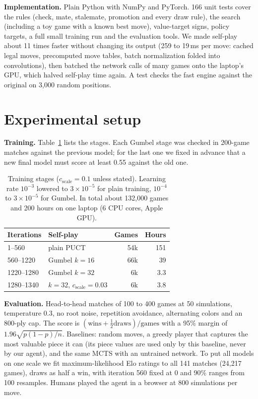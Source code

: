 \documentclass[11pt,a4paper,twocolumn]{article}
\begin{document}
\textbf{Implementation.} Plain Python with NumPy and PyTorch. 166 unit tests cover the rules
(check, mate, stalemate, promotion and every draw rule), the search (including a toy game
with a known best move), value-target signs, policy targets, a full small training run and
the evaluation tools. We made self-play about 11 times faster without changing its output
(259 to 19\,ms per move: cached legal moves, precomputed move tables, batch normalization
folded into convolutions), then batched the network calls of many games onto the laptop's
GPU, which halved self-play time again. A test checks the fast engine against the original
on 3,000 random positions.

\section{Experimental setup}
\textbf{Training.} Table~\ref{tab:stages} lists the stages. Each Gumbel stage was checked
in 200-game matches against the previous model; for the last one we fixed in advance
that a new final model must score at least 0.55 against the old one.

\begin{table}[h]
\centering
\small
\begin{tabular}{@{}llrr@{}}
\toprule
Iterations & Self-play & Games & Hours \\
\midrule
1--560 & plain PUCT & 54k & 151 \\
560--1220 & Gumbel $k{=}16$ & 66k & 39 \\
1220--1280 & Gumbel $k{=}32$ & 6k & 3.3 \\
1280--1340 & $k{=}32$, $c_{\text{scale}}{=}0.03$ & 6k & 3.8 \\
\bottomrule
\end{tabular}
\caption{Training stages ($c_{\text{scale}}=0.1$ unless stated). Learning rate $10^{-3}$
lowered to $3\times10^{-5}$ for plain training, $10^{-4}$ to $3\times10^{-5}$ for Gumbel. In total about 132,000
games and 200 hours on one laptop (6 CPU cores, Apple GPU).}
\label{tab:stages}
\end{table}

\textbf{Evaluation.} Head-to-head matches of 100 to 400 games at 50 simulations,
temperature 0.3, no root noise, repetition avoidance, alternating colors and an 800-ply
cap. The score is $(\text{wins}+\tfrac12\text{draws})/\text{games}$ with a 95\% margin of
$1.96\sqrt{p(1-p)/n}$. Baselines: random moves, a greedy player that captures the most
valuable piece it can (its piece values are used only by this baseline, never by our
agent), and the same MCTS with an untrained network. To put all models on one scale we fit
maximum-likelihood Elo ratings to all 141 matches (24,217 games), draws as half a win, with
iteration 560 fixed at 0 and 90\% ranges from 100 resamples. Humans played the agent in a
browser at 800 simulations per move.
\end{document}
